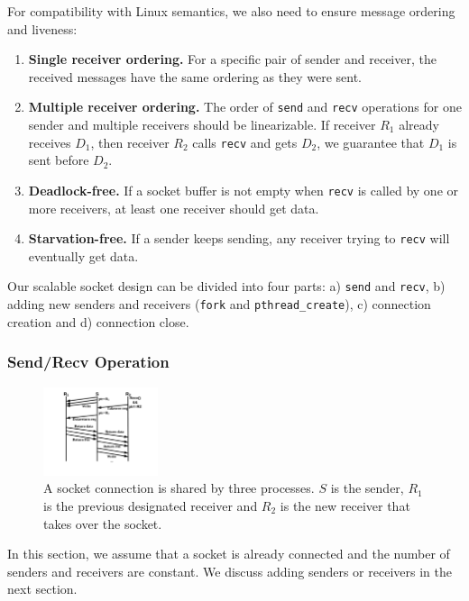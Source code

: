 For compatibility with Linux semantics, we also need to ensure message ordering and liveness:
\begin{enumerate}
\item \textbf{Single receiver ordering.} For a specific pair of sender and receiver, the received messages have the same ordering as they were sent.
\item \textbf{Multiple receiver ordering.} The order of \texttt{send} and \texttt{recv} operations for one sender and multiple receivers should be linearizable. If receiver $R_1$ already receives $D_1$, then receiver $R_2$ calls \texttt{recv} and gets $D_2$, we guarantee that $D_1$ is sent before $D_2$.
\item \textbf{Deadlock-free.} If a socket buffer is not empty when \texttt{recv} is called by one or more receivers, at least one receiver should get data.
\item \textbf{Starvation-free.} If a sender keeps sending, any receiver trying to \texttt{recv} will eventually get data.
\end{enumerate}

Our scalable socket design can be divided into four parts: a) \texttt{send} and \texttt{recv}, b) adding new senders and receivers (\texttt{fork} and \texttt{pthread\_create}), c) connection creation and d) connection close.

\subsubsection{Send/Recv Operation}
\label{subsubsec:fork_rdwr}

\begin{figure}[t]
	\centering
	\includegraphics[width=0.3\textwidth]{images/takeover}
	\caption{A socket connection is shared by three processes. $S$ is the sender, $R_1$ is the previous designated receiver and $R_2$ is the new receiver that takes over the socket.}
	\label{fig:fork-takeover}
\end{figure}

In this section, we assume that a socket is already connected and the number of senders and receivers are constant. We discuss adding senders or receivers in the next section.

